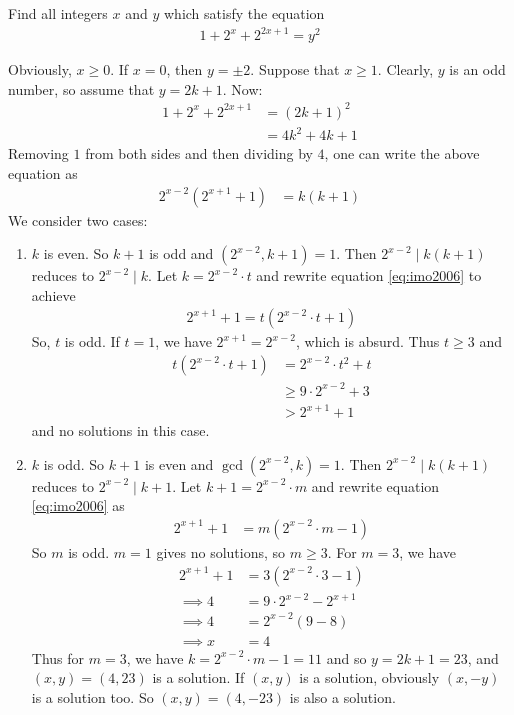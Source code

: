 \documentclass[problems.tex]{subfile}
\begin{document}
	\begin{problem}[IMO 2006]
		Find all integers $x$ and $y$ which satisfy the equation
			\begin{align*}
				1 + 2^x + 2^{2x + 1} = y^2
			\end{align*}
	\end{problem}

	\begin{solution}
		Obviously, $x \ge 0$. If $x = 0$, then $y = \pm 2$. Suppose that $x \ge 1$. Clearly, $y$ is an odd number, so assume that $y = 2k + 1$. Now:
			\begin{align*}
				1 + 2^x + 2^{2x + 1}
					& = (2k + 1)^2\\
					& = 4k^2 + 4k + 1
			\end{align*}
		Removing $1$ from both sides and then dividing by $4$, one can write the above equation as
			\begin{align}\label{eq:imo2006}
				2^{x - 2}(2^{x + 1} + 1)
					& = k(k + 1)
			\end{align}
		We consider two cases:
		\begin{enumerate}
			\item $k$ is even. So $k + 1$ is odd and $(2^{x - 2}, k + 1) = 1$. Then $2^{x - 2}\mid k(k + 1)$ reduces to $2^{x - 2}\mid k$. Let $k = 2^{x - 2} \cdot t$ and rewrite equation \eqref{eq:imo2006} to achieve
				\begin{align*}
					2^{x + 1} + 1 = t(2^{x - 2} \cdot t + 1)
				\end{align*}
			So, $t$ is odd. If $t = 1$, we have $2^{x + 1} = 2^{x - 2}$, which is absurd. Thus $t \ge 3$ and
				\begin{align*}
					t(2^{x - 2} \cdot t + 1)
						& = 2^{x - 2} \cdot t^2 + t\\
						& \ge 9 \cdot 2^{x - 2} + 3\\
						& > 2^{x + 1} + 1
				\end{align*}
			and no solutions in this case.

			\item $k$ is odd. So $k + 1$ is even and $\gcd(2^{x - 2}, k) = 1$. Then $2^{x - 2}\mid k(k + 1)$ reduces to $2^{x - 2}\mid k+1$. Let $k+1 = 2^{x - 2} \cdot m$ and rewrite equation \eqref{eq:imo2006} as
				\begin{align*}
					2^{x + 1} + 1
						& = m(2^{x - 2} \cdot m - 1)
				\end{align*}
			So $m$ is odd. $m = 1$ gives no solutions, so $m \ge 3$. For $m = 3$, we have
				\begin{align*}
					2^{x + 1} + 1
						& = 3(2^{x - 2} \cdot 3 - 1)\\
					\implies 4
						& = 9 \cdot 2^{x - 2} - 2^{x + 1} \\
					\implies 4
						& = 2^{x - 2}(9 - 8) \\
					\implies x
						& = 4
				\end{align*}
			Thus for $m = 3$, we have $k = 2^{x - 2} \cdot m - 1 = 11$ and so $y = 2k + 1 = 23$, and $(x, y) = (4, 23)$ is a solution. If $(x, y)$ is a solution, obviously $(x, -y)$ is a solution too. So $(x, y) = (4, -23)$ is also a solution.


\end{enumerate}
\end{solution}
\end{document}
